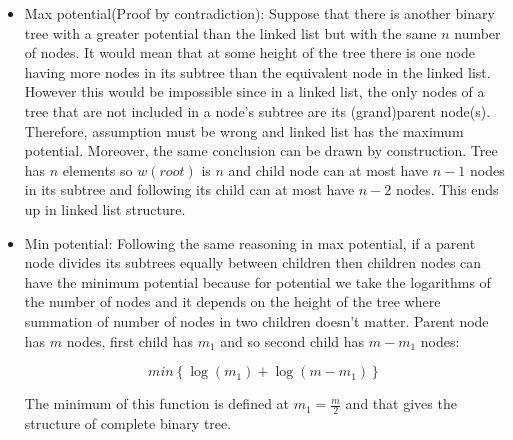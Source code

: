   
  \begin{itemize}
    \item Max potential(Proof by contradiction):
      Suppose that there is another binary tree with a greater potential than the linked list but with the same $n$ number of nodes. It would mean that at some height of the tree there is one node having more nodes in its subtree than the equivalent node in the linked list. However this would be impossible since in a linked list, the only nodes of a tree that are not included in a node's subtree are its (grand)parent node(s). Therefore, assumption must be wrong and linked list has the maximum potential. Moreover, the same conclusion can be drawn by construction. Tree has $n$ elements so $w(root)$ is $n$ and child node can at most have $n-1$ nodes in its subtree and following its child can at most have $n-2$ nodes. This ends up in linked list structure.
    \item Min potential:
      Following the same reasoning in max potential, if a parent node divides its subtrees equally between children then children nodes can have the minimum potential because for potential we take the logarithms of the number of nodes and it depends on the height of the tree where summation of number of nodes in two children doesn't matter. Parent node has $m$ nodes, first child has $m_1$ and so second child has $m-m_1$ nodes:
      
      $$
        min \left\lbrace \log(m_1) + \log(m-m_1) \right\rbrace
      $$
      
      The minimum of this function is defined at $m_1 = \frac{m}{2}$ and that gives the structure of complete binary tree.
  \end{itemize}